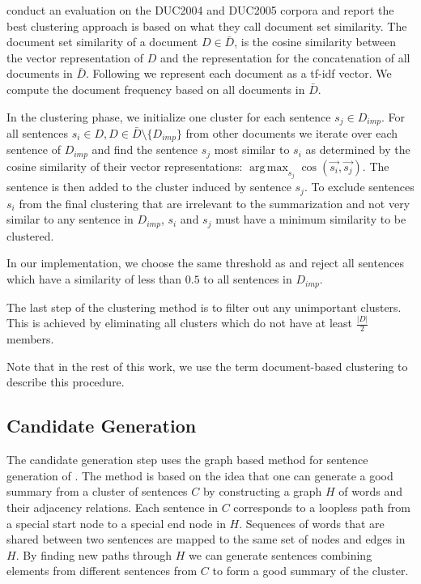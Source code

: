 \documentclass[a4paper,BCOR=10mm]{report}
\DeclareMathOperator*{\argmax}{arg\,max}
\numberwithin{lemma}{chapter}
\numberwithin{definition}{chapter}
\begin{document}
\citeauthor{banerjee} conduct an evaluation on the DUC2004 \citep{duc2004} and DUC2005 \citep{duc2005} corpora and report the best clustering approach is based on what they call document set similarity.
The document set similarity of a document $D \in \bar{D}$, is the cosine similarity between the vector representation of $D$ and the representation for the concatenation of all documents in $\bar{D}$.
Following \citeauthor{banerjee} we represent each document as a tf-idf vector. We compute the document frequency based on all documents in $\bar{D}$.

In the clustering phase, we initialize one cluster for each sentence $s_j \in D_{imp}$. For all sentences $s_i \in D, D \in \bar{D} \setminus \{D_{imp}\}$ from other documents we iterate over each sentence of $D_{imp}$ and find the sentence $s_j$ most similar to $s_i$ as determined by the cosine similarity of their vector representations: $\argmax_{s_j} \cos(\vec{s_i}, \vec{s_j})$. The sentence is then added to the cluster induced by sentence $s_j$. To exclude sentences $s_i$ from the final clustering that are irrelevant to the summarization and not very similar to any sentence in $D_{imp}$, $s_i$ and $s_j$ must have a minimum similarity to be clustered.

In our implementation, we choose the same threshold as \citeauthor{banerjee} and reject all sentences which have a similarity of less than $0.5$ to all sentences in $D_{imp}$.

The last step of the clustering method is to filter out any unimportant clusters. This is achieved by eliminating all clusters which do not have at least $\frac{|D|}{2}$ members.

Note that in the rest of this work, we use the term document-based clustering to describe this procedure.


\subsection{Candidate Generation} \label{sec:baseline-generation}

The candidate generation step uses the graph based method for sentence generation of \citet{filippova}. The method is based on the idea that one can generate a good summary from a cluster of sentences $C$ by constructing a graph $H$ of words and their adjacency relations. Each sentence in $C$ corresponds to a loopless path from a special start node to a special end node in $H$. Sequences of words that are shared between two sentences are mapped to the same set of nodes and edges in $H$. By finding new paths through $H$ we can generate sentences combining elements from different sentences from $C$ to form a good summary of the cluster.
\end{document}
